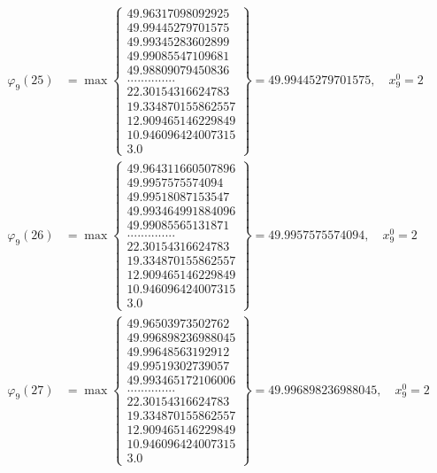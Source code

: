 \documentclass{article}
\begin{document}
\begin{align*}
  
  
  
\varphi_{9}(25) &= \max \left\{ \begin{array}{c}
49.96317098092925 \\
 49.99445279701575 \\
 49.99345283602899 \\
 49.99085547109681 \\
 49.98809079450836 \\
 .............. \\
 22.30154316624783 \\
 19.334870155862557 \\
 12.909465146229849 \\
 10.946096424007315 \\
 3.0
\end{array} \right\} = 49.99445279701575, \quad x_{9}^0 = 2\\
  
  
  
  
\varphi_{9}(26) &= \max \left\{ \begin{array}{c}
49.964311660507896 \\
 49.9957575574094 \\
 49.99518087153547 \\
 49.993464991884096 \\
 49.99085565131871 \\
 .............. \\
 22.30154316624783 \\
 19.334870155862557 \\
 12.909465146229849 \\
 10.946096424007315 \\
 3.0
\end{array} \right\} = 49.9957575574094, \quad x_{9}^0 = 2\\
  
  
  
  
\varphi_{9}(27) &= \max \left\{ \begin{array}{c}
49.96503973502762 \\
 49.996898236988045 \\
 49.99648563192912 \\
 49.99519302739057 \\
 49.993465172106006 \\
 .............. \\
 22.30154316624783 \\
 19.334870155862557 \\
 12.909465146229849 \\
 10.946096424007315 \\
 3.0
\end{array} \right\} = 49.996898236988045, \quad x_{9}^0 = 2\\
  

\end{align*}
\end{document}

